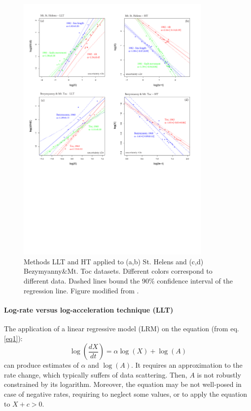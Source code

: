 \documentclass{article}
\begin{document}
\begin{figure}[H]
\centering
\includegraphics[width=0.85\textwidth]{Fig4_plus.pdf}
\vskip-0.5cm\caption{Methods LLT and HT applied to (a,b) St. Helens and (c,d) Bezymyanny\&Mt. Toc datasets. Different colors correspond to different data. Dashed lines bound the $90\%$ confidence interval of the regression line. Figure modified from \cite{Voight1988}.}
\label{Fig4}
\end{figure}

\paragraph{Log-rate versus log-acceleration technique (LLT)}
The application of a linear regressive model (LRM) on the equation (from eq. \ref{eq1}):
$$\log\left(\frac{dX}{dt}\right)=\alpha\log(X)+\log(A)$$
can produce estimates of $\alpha$ and $\log(A)$. It requires an approximation to the rate change, which typically suffers of data scattering. Then, $A$ is not robustly constrained by its logarithm. Moreover, the equation may be not well-posed in case of negative rates, requiring to neglect some values, or to apply the equation to $X+c > 0$.
\end{document}
